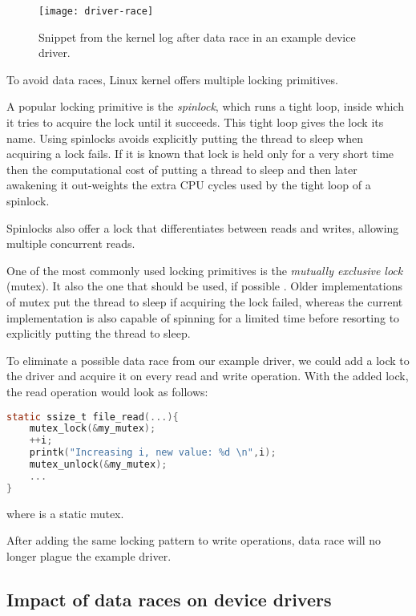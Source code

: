 \documentclass[..thesis.tex]{subfiles}
\begin{document}
\begin{figure}[H]
\centering
\texttt{[image: driver-race]}
\caption{Snippet from the kernel log after data race in an example device driver.}
\label{fig:driver-race}
\end{figure}



To avoid data races, Linux kernel offers multiple locking primitives. 

A popular locking primitive is the \textit{spinlock}, which runs a tight loop, inside which it tries to acquire the lock until it succeeds.
This tight loop gives the lock its name. Using spinlocks avoids explicitly putting the thread to sleep when acquiring a lock fails.
If it is known that lock is held only for a very short time then the computational cost of putting a thread to sleep and then later awakening
it out-weights the extra CPU cycles used by the tight loop of a spinlock.

Spinlocks also offer a lock that differentiates between reads and writes, allowing multiple concurrent reads.

One of the most commonly used locking primitives is the \textit{mutually exclusive lock} (mutex). It also the one that should be used, if possible
\cite[Documentation/locking/mutex-design.txt]{torvalds_linux}. Older implementations of mutex put the thread to sleep if acquiring the lock failed,
whereas the current implementation is also capable of spinning for a limited time before resorting to explicitly putting the thread to sleep.

To eliminate a possible data race from our example driver, we could add a lock to the driver and acquire it on every read and write operation.
With the added lock, the read operation would look as follows:

\begin{lstlisting}[language=C,style=def]
static ssize_t file_read(...){
    mutex_lock(&my_mutex);
    ++i;
    printk("Increasing i, new value: %d \n",i);
    mutex_unlock(&my_mutex);
    ...
}
\end{lstlisting}

where  is a static mutex.

After adding the same locking pattern to write operations, data race will no longer plague the example driver.

\subsection{Impact of data races on device drivers}
\end{document}
